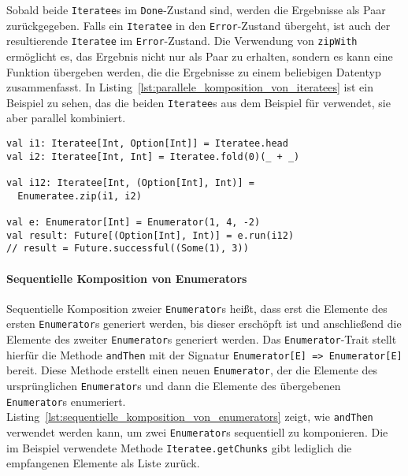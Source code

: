 \documentclass[draft=false
              ,paper=a4
              ,twoside=false
              ,fontsize=11pt
              ,headsepline
              ,BCOR10mm
              ,DIV11
              ]{scrbook}
\begin{document}
Sobald beide \lstinline|Iteratee|s im \lstinline|Done|-Zustand sind, werden die Ergebnisse als Paar zurückgegeben.
Falls ein \lstinline|Iteratee| in den \lstinline|Error|-Zustand übergeht, ist auch der resultierende \lstinline|Iteratee| im \lstinline|Error|-Zustand.
Die Verwendung von \lstinline|zipWith| ermöglicht es, das Ergebnis nicht nur als Paar zu erhalten, sondern es kann eine Funktion übergeben werden, die die Ergebnisse zu einem beliebigen Datentyp zusammenfasst.
In Listing~\ref{lst:parallele_komposition_von_iteratees} ist ein Beispiel zu sehen, das die beiden \lstinline|Iteratee|s aus dem Beispiel für  verwendet, sie aber parallel kombiniert.

\begin{lstlisting}[caption=Parallele Komposition von Iteratees, label=lst:parallele_komposition_von_iteratees]
val i1: Iteratee[Int, Option[Int]] = Iteratee.head
val i2: Iteratee[Int, Int] = Iteratee.fold(0)(_ + _)

val i12: Iteratee[Int, (Option[Int], Int)] =
  Enumeratee.zip(i1, i2)

val e: Enumerator[Int] = Enumerator(1, 4, -2)
val result: Future[(Option[Int], Int)] = e.run(i12)
// result = Future.successful((Some(1), 3))
\end{lstlisting}


\paragraph{Sequentielle Komposition von Enumerators} %
\label{subp:anwendung_sequentielle_komposition_von_enumerators}\mbox{} %

Sequentielle Komposition zweier \lstinline|Enumerator|s heißt, dass erst die Elemente des ersten \lstinline|Enumerator|s generiert werden, bis dieser erschöpft ist und anschließend die Elemente des zweiter \lstinline|Enumerator|s generiert werden.
Das \lstinline|Enumerator|-Trait stellt hierfür die Methode \lstinline|andThen| mit der Signatur \lstinline[breaklines=true]|Enumerator[E] => Enumerator[E]| bereit.
Diese Methode erstellt einen neuen \lstinline|Enumerator|, der die Elemente des ursprünglichen \lstinline|Enumerator|s und dann die Elemente des übergebenen \lstinline|Enumerator|s enumeriert.
Listing~\ref{lst:sequentielle_komposition_von_enumerators} zeigt, wie \lstinline|andThen| verwendet werden kann, um zwei \lstinline|Enumerator|s sequentiell zu komponieren.
Die im Beispiel verwendete Methode \lstinline|Iteratee.getChunks| gibt lediglich die empfangenen Elemente als Liste zurück.
\end{document}

